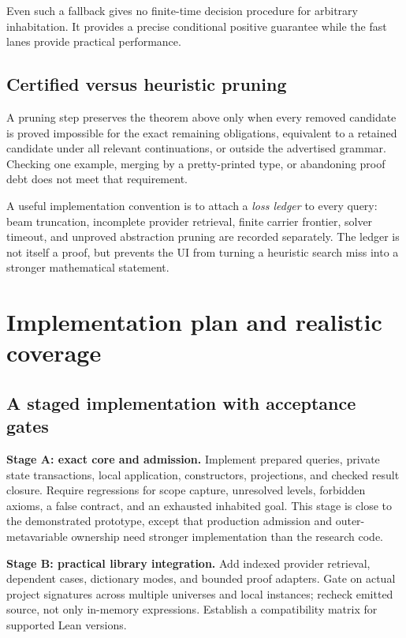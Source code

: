 \documentclass[11pt,letterpaper]{article}
\theoremstyle{definition}\newtheorem{definition}[theorem]{Definition}
\theoremstyle{remark}\newtheorem{remark}[theorem]{Remark}
\begin{document}
Even such a fallback gives no finite-time decision procedure for arbitrary
inhabitation. It provides a precise conditional positive guarantee while the
fast lanes provide practical performance.

\subsection{Certified versus heuristic pruning}

A pruning step preserves the theorem above only when every removed candidate is
proved impossible for the exact remaining obligations, equivalent to a retained
candidate under all relevant continuations, or outside the advertised grammar.
Checking one example, merging by a pretty-printed type, or abandoning proof debt
does not meet that requirement.

A useful implementation convention is to attach a \emph{loss ledger} to every
query: beam truncation, incomplete provider retrieval, finite carrier frontier,
solver timeout, and unproved abstraction pruning are recorded separately. The
ledger is not itself a proof, but prevents the UI from turning a heuristic search
miss into a stronger mathematical statement.

\section{Implementation plan and realistic coverage}
\label{sec:roadmap}

\subsection{A staged implementation with acceptance gates}

\textbf{Stage A: exact core and admission.} Implement prepared queries, private
state transactions, local application, constructors, projections, and checked
result closure. Require regressions for scope capture, unresolved levels,
forbidden axioms, a false contract, and an exhausted inhabited goal. This stage
is close to the demonstrated prototype, except that production admission and
outer-metavariable ownership need stronger implementation than the research code.

\textbf{Stage B: practical library integration.} Add indexed provider retrieval,
dependent cases, dictionary modes, and bounded proof adapters. Gate on actual
project signatures across multiple universes and local instances; recheck emitted
source, not only in-memory expressions. Establish a compatibility matrix for
supported Lean versions.
\end{document}
